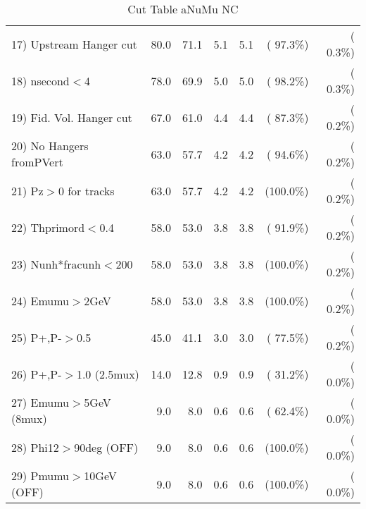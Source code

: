 \begin{table}[h!]
\begin{tabular}{||l||r|r|r|r|r|r||}
 17) Upstream Hanger cut  &         80.0 &         71.1 &          5.1 &          5.1 & ( 97.3\%) & (  0.3\%) \\
 18) nsecond$<$4          &         78.0 &         69.9 &          5.0 &          5.0 & ( 98.2\%) & (  0.3\%) \\
 19) Fid. Vol. Hanger cut &         67.0 &         61.0 &          4.4 &          4.4 & ( 87.3\%) & (  0.2\%) \\
 20) No Hangers fromPVert &         63.0 &         57.7 &          4.2 &          4.2 & ( 94.6\%) & (  0.2\%) \\
 21) Pz$>$0 for tracks    &         63.0 &         57.7 &          4.2 &          4.2 & (100.0\%) & (  0.2\%) \\
 22) Thprimord$<$0.4      &         58.0 &         53.0 &          3.8 &          3.8 & ( 91.9\%) & (  0.2\%) \\
 23) Nunh*fracunh$<$200   &         58.0 &         53.0 &          3.8 &          3.8 & (100.0\%) & (  0.2\%) \\
 24) Emumu$>$2GeV         &         58.0 &         53.0 &          3.8 &          3.8 & (100.0\%) & (  0.2\%) \\
 25) P+,P-$>$0.5          &         45.0 &         41.1 &          3.0 &          3.0 & ( 77.5\%) & (  0.2\%) \\
 26) P+,P-$>$1.0 (2.5mux) &         14.0 &         12.8 &          0.9 &          0.9 & ( 31.2\%) & (  0.0\%) \\
 27) Emumu$>$5GeV  (8mux) &          9.0 &          8.0 &          0.6 &          0.6 & ( 62.4\%) & (  0.0\%) \\
 28) Phi12$>$90deg  (OFF) &          9.0 &          8.0 &          0.6 &          0.6 & (100.0\%) & (  0.0\%) \\
 29) Pmumu$>$10GeV  (OFF) &          9.0 &          8.0 &          0.6 &          0.6 & (100.0\%) & (  0.0\%) \\
 \hline
 \hline
 \end{tabular}
 \caption{Cut Table  aNuMu NC }
 \label{tab-cutcohjpsi-mumu_anumunc}
 \end{table}
